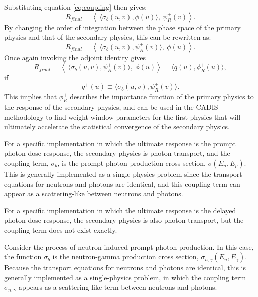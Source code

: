 Substituting equation \ref{eq:coupling} then gives:
\begin{equation}
  R_{final} = \left \langle\  \langle \sigma_b(u,v) , \phi(u) \rangle,\  \psi_R^{+}(v) \right\rangle.
\end{equation}
By changing the order of integration between the phase space of the primary
physics and that of the secondary physics, this can be rewritten as:
\begin{equation}\label{eq:pseudo-response}
  R_{final} = \left \langle \ \langle \sigma_b(u,v) , \psi_R^{+}(v) \rangle,\  \phi(u) \right\rangle.
\end{equation}
Once again invoking the adjoint identity gives
\begin{equation}
  R_{final} = \left \langle \ \langle \sigma_b(u,v) , \psi_R^{+}(v) \rangle,\  \phi(u) \right\rangle = \langle q(u), \phi_R^{+}(u) \rangle,
\end{equation}
if
\begin{equation}
  q^{+}(u) \equiv \langle \sigma_b(u,v) , \psi_R^{+}(v) \rangle.
\end{equation}
This implies that $\phi_R^{+}$ describes the importance function of the
primary physics to the response of the secondary physics, and can be used in
the CADIS methodology to find weight window parameters for the first physics
that will ultimately accelerate the statistical convergence of the secondary
physics.

For a specific implementation in which the ultimate response is the prompt
photon dose response, the secondary physics is photon transport, and the
coupling term, $\sigma_b$, is the prompt photon production cross-section,
$\sigma(E_n,E_p)$.  This is generally implemented as a single physics problem
since the transport equations for neutrons and photons are identical, and this
coupling term can appear as a scattering-like between neutrons and photons.

For a specific implementation in which the ultimate response is the delayed
photon dose response, the secondary physics is also photon transport, but the
coupling term does not exist exactly.  


Consider the process of neutron-induced prompt photon production.
In this case, the function $\sigma_b$ is the neutron-gamma production
cross section, $\sigma_{n,\gamma}(E_n,E_\gamma)$.  Because the transport
equations for neutrons and photons are identical, this is generally
implemented as a single-physics problem, in which the coupling term
$\sigma_{n,\gamma}$ appears as a scattering-like term between neutrons
and photons.


